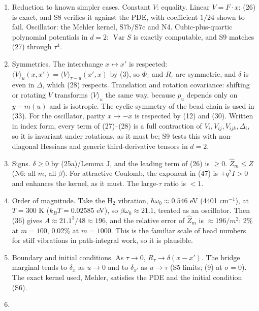 \documentclass[11pt,a4paper]{article}
\begin{document}
\begin{enumerate}
\item
  Reduction to known simpler cases. Constant \(V\): equality. Linear \(V=F\cdot x\): (26) is exact, and S8 verifies it against the PDE, with coefficient \(1/24\) shown to fail. Oscillator: the Mehler kernel, S7b/S7c and N4. Cubic-plus-quartic polynomial potentials in \(d=2\): \(\operatorname{Var}S\) is exactly computable, and S9 matches (27) through \(\tau^4\).
\item
  Symmetries. The interchange \(x\leftrightarrow x'\) is respected: \(\langle V\rangle_u(x,x')=\langle V\rangle_{\tau-u}(x',x)\) by (3), so \(\Phi_\tau\) and \(R_\tau\) are symmetric, and \(\delta\) is even in \(\Delta\), which (28) respects. Translation and rotation covariance: shifting or rotating \(V\) transforms \(\langle V\rangle_u\) the same way, because \(p_u\) depends only on \(y-m(u)\) and is isotropic. The cyclic symmetry of the bead chain is used in (33). For the oscillator, parity \(x\to-x\) is respected by (12) and (30). Written in index form, every term of (27)--(28) is a full contraction of \(V_i,V_{ij},V_{ijk},\Delta_i\), so it is invariant under rotations, as it must be; S9 tests this with non-diagonal Hessians and generic third-derivative tensors in \(d=2\).
\item
  Signs. \(\delta\ge0\) by (25a)/Lemma J, and the leading term of (26) is \(\ge0\). \(\hat Z_m\le Z\) (N6: all \(m\), all \(\beta\)). For attractive Coulomb, the exponent in (47) is \(+q^2I>0\) and enhances the kernel, as it must. The large-\(\tau\) ratio is \(<1\).
\item
  Order of magnitude. Take the H\(_2\) vibration, \(\hbar\omega_0\approx0.546\) eV (4401 cm\(^{-1}\)), at \(T=300\) K (\(k_BT=0.02585\) eV), so \(\beta\omega_0\approx21.1\), treated as an oscillator. Then (36) gives \(A\approx21.1^3/48\approx196\), and the relative error of \(\hat Z_m\) is \(\approx196/m^2\): 2\% at \(m=100\), 0.02\% at \(m=1000\). This is the familiar scale of bead numbers for stiff vibrations in path-integral work, so it is plausible.
\item
  Boundary and initial conditions. As \(\tau\to0\), \(R_\tau\to\delta(x-x')\). The bridge marginal tends to \(\delta_x\) as \(u\to0\) and to \(\delta_{x'}\) as \(u\to\tau\) (S5 limits; (9) at \(\sigma=0\)). The exact kernel used, Mehler, satisfies the PDE and the initial condition (S6).
\item

\end{enumerate}
\end{document}
